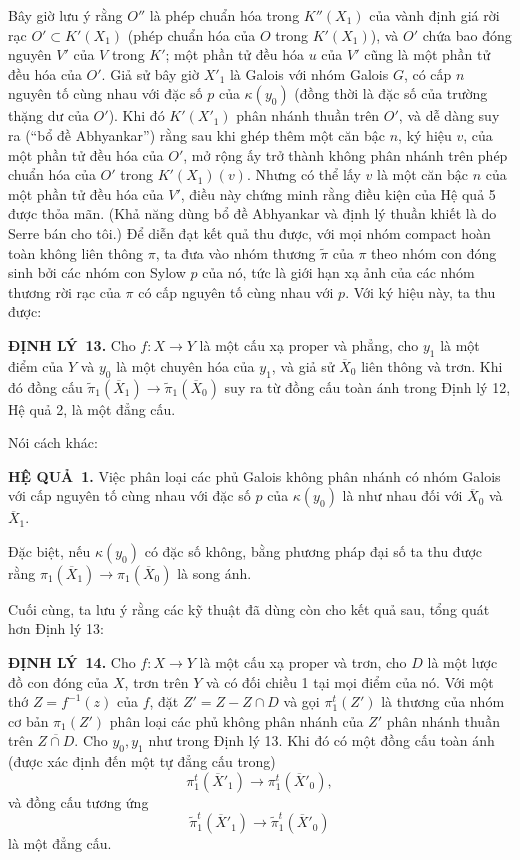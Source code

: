 \documentclass[11pt,twoside,openany]{book}
\numberwithin{equation}{section}
\newcommand{\src}[1]{%
  \phantomsection\hypertarget{src:\fgasourceid:#1}{}%
  \marginpar{\raggedleft\footnotesize\sffamily #1}%
}
\newcommand{\fgasourceid}{unset}
\newcommand{\result}[2]{\par\medskip\noindent\textbf{#1\if\relax\detokenize{#2}\relax\else\ #2\fi.}\quad}
\begin{document}
Bây giờ lưu ý rằng $O''$ là phép chuẩn hóa trong $K''(X_1)$ của vành định giá
rời rạc $O'\subset K'(X_1)$ (phép chuẩn hóa của $O$ trong $K'(X_1)$), và
$O'$ chứa bao đóng nguyên $V'$ của $V$ trong $K'$; một phần tử đều hóa $u$ của
$V'$ cũng là một phần tử đều hóa của $O'$. Giả sử bây giờ $X'_1$ là Galois với
nhóm Galois $G$, có cấp $n$ nguyên tố cùng nhau với đặc số $p$ của
$\kappa(y_0)$ (đồng thời là đặc số của trường thặng dư của $O'$). Khi đó
$K'(X'_1)$ phân nhánh thuần trên $O'$, và dễ dàng suy ra (“bổ đề Abhyankar”)
rằng sau khi ghép thêm một căn bậc $n$, ký hiệu $v$, của một phần tử đều hóa
của $O'$, mở rộng ấy trở thành không phân nhánh trên phép chuẩn hóa của $O'$
trong $K'(X_1)(v)$. Nhưng có thể lấy $v$ là một căn bậc $n$ của một phần tử
đều hóa của $V'$, điều này chứng minh rằng điều kiện của Hệ quả 5 được thỏa
mãn. (Khả năng dùng bổ đề Abhyankar và định lý thuần khiết là do Serre bán cho
tôi.) Để diễn đạt kết quả thu được, với mọi nhóm compact hoàn toàn không liên
thông $\pi$, ta đưa vào nhóm thương $\widetilde\pi$ của $\pi$ theo nhóm con
đóng sinh bởi các nhóm con Sylow $p$ của nó, tức là giới hạn xạ ảnh của các
nhóm thương rời rạc của $\pi$ có cấp nguyên tố cùng nhau với $p$. Với ký hiệu
này, ta thu được:

\result{ĐỊNH LÝ}{13} Cho $f:X\longrightarrow Y$ là một cấu xạ proper và
phẳng, cho $y_1$ là một điểm của $Y$ và $y_0$ là một chuyên hóa của $y_1$, và
giả sử $\overline X_0$ liên thông và trơn. Khi đó đồng cấu
$\widetilde\pi_1(\overline X_1)\longrightarrow
\widetilde\pi_1(\overline X_0)$ suy ra từ đồng cấu toàn ánh trong Định lý 12,
Hệ quả 2, là một đẳng cấu.

Nói cách khác:

\src{219}
\result{HỆ QUẢ}{1} Việc phân loại các phủ Galois không phân nhánh có nhóm
Galois với cấp nguyên tố cùng nhau với đặc số $p$ của $\kappa(y_0)$ là như
nhau đối với $\overline X_0$ và $\overline X_1$.

Đặc biệt, nếu $\kappa(y_0)$ có đặc số không, bằng phương pháp đại số ta thu
được rằng $\pi_1(\overline X_1)\longrightarrow\pi_1(\overline X_0)$ là song
ánh.

Cuối cùng, ta lưu ý rằng các kỹ thuật đã dùng còn cho kết quả sau, tổng quát
hơn Định lý 13:

\result{ĐỊNH LÝ}{14} Cho $f:X\longrightarrow Y$ là một cấu xạ proper và trơn,
cho $D$ là một lược đồ con đóng của $X$, trơn trên $Y$ và có đối chiều 1 tại
mọi điểm của nó. Với một thớ $Z=f^{-1}(z)$ của $f$, đặt $Z'=Z-Z\cap D$ và gọi
$\pi_1^t(Z')$ là thương của nhóm cơ bản $\pi_1(Z')$ phân loại các phủ không
phân nhánh của $Z'$ phân nhánh thuần trên $\overline{Z\cap D}$. Cho $y_0,y_1$
như trong Định lý 13. Khi đó có một đồng cấu toàn ánh (được xác định đến một tự
đẳng cấu trong)
\[
  \pi_1^t(\overline X'_1)\longrightarrow\pi_1^t(\overline X'_0),
\]
và đồng cấu tương ứng
\[
  \widetilde\pi_1^t(\overline X'_1)
  \longrightarrow\widetilde\pi_1^t(\overline X'_0)
\]
là một đẳng cấu.
\end{document}
